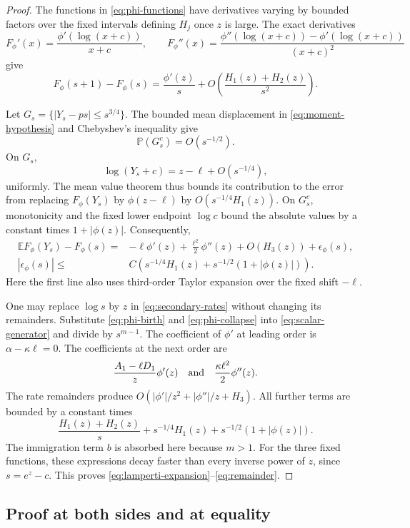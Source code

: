 \documentclass[11pt,a4paper]{article}
\theoremstyle{remark}\newtheorem{remark}[theorem]{Remark}
\newcommand{\E}{\mathbb E}
\newcommand{\Prob}{\mathbb P}
\begin{document}
\begin{proof}
The functions in \eqref{eq:phi-functions} have derivatives varying by bounded factors over the fixed intervals defining $H_j$ once $z$ is large. The exact derivatives
\[
F_\phi'(x)=\frac{\phi'(\log(x+c))}{x+c},\qquad
F_\phi''(x)=\frac{\phi''(\log(x+c))-\phi'(\log(x+c))}{(x+c)^2}
\]
give
\begin{equation}\label{eq:phi-birth}
F_\phi(s+1)-F_\phi(s)
=\frac{\phi'(z)}s+O\!\left(\frac{H_1(z)+H_2(z)}{s^2}\right).
\end{equation}

Let $G_s=\{|Y_s-ps|\le s^{3/4}\}$. The bounded mean displacement in \eqref{eq:moment-hypothesis} and Chebyshev's inequality give
\[
\Prob(G_s^c)=O(s^{-1/2}).
\]
On $G_s$,
\[
\log(Y_s+c)=z-\ell+O(s^{-1/4}),
\]
uniformly. The mean value theorem thus bounds its contribution to the error from replacing $F_\phi(Y_s)$ by $\phi(z-\ell)$ by
$O(s^{-1/4}H_1(z))$. On $G_s^c$, monotonicity and the fixed lower endpoint $\log c$ bound the absolute values by a constant times $1+|\phi(z)|$. Consequently,
\begin{align}
\E F_\phi(Y_s)-F_\phi(s)
={}&-\ell\phi'(z)+\frac{\ell^2}{2}\phi''(z)+O(H_3(z))
+\epsilon_\phi(s),\label{eq:phi-collapse}\\
|\epsilon_\phi(s)|
\le{}&C\left(s^{-1/4}H_1(z)
        +s^{-1/2}(1+|\phi(z)|)\right).\label{eq:retention-error}
\end{align}
Here the first line also uses third-order Taylor expansion over the fixed shift $-\ell$.

One may replace $\log s$ by $z$ in \eqref{eq:secondary-rates} without changing its remainders. Substitute \eqref{eq:phi-birth} and \eqref{eq:phi-collapse} into \eqref{eq:scalar-generator} and divide by $s^{m-1}$. The coefficient of $\phi'$ at leading order is $\alpha-\kappa\ell=0$. The coefficients at the next order are
\[
\frac{A_1-\ell D_1}{z}\phi'(z)
\quad\hbox{and}\quad
\frac{\kappa\ell^2}{2}\phi''(z).
\]
The rate remainders produce
$O(|\phi'|/z^2+|\phi''|/z+H_3)$.
All further terms are bounded by a constant times
\[
\frac{H_1(z)+H_2(z)}s
+s^{-1/4}H_1(z)+s^{-1/2}(1+|\phi(z)|).
\]
The immigration term $b$ is absorbed here because $m>1$. For the three fixed functions, these expressions decay faster than every inverse power of $z$, since $s=e^z-c$. This proves \eqref{eq:lamperti-expansion}--\eqref{eq:remainder}.
\end{proof}

\subsection{Proof at both sides and at equality}
\end{document}
